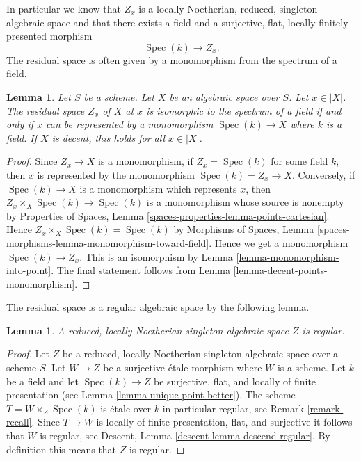 \documentclass{stacks-project}
\theoremstyle{plain}
\newtheorem{lemma}[subsection]{Lemma}
\theoremstyle{definition}
\theoremstyle{remark}
\numberwithin{equation}{subsection}
\def\Spec{\mathop{\mathrm{Spec}}}
\begin{document}
\noindent
In particular we know that $Z_x$ is a
locally Noetherian, reduced, singleton algebraic space
and that there exists a field and a surjective, flat, locally
finitely presented morphism
$$
\Spec(k) \longrightarrow Z_x.
$$
The residual space is often given by a monomorphism
from the spectrum of a field.

\begin{lemma}
\label{lemma-residual-space-monomorphism}
Let $S$ be a scheme. Let $X$ be an algebraic space over $S$. Let $x \in |X|$.
The residual space $Z_x$ of $X$ at $x$ is isomorphic to the spectrum of a field
if and only if $x$ can be represented by a monomorphism $\Spec(k) \to X$
where $k$ is a field. If $X$ is decent, this holds for all $x \in |X|$.
\end{lemma}

\begin{proof}
Since $Z_x \to X$ is a monomorphism, if $Z_x = \Spec(k)$ for some field $k$,
then $x$ is represented by the monomorphism $\Spec(k) = Z_x \to X$.
Conversely, if $\Spec(k) \to X$ is a monomorphism which represents $x$,
then $Z_x \times_X \Spec(k) \to \Spec(k)$ is a monomorphism whose source
is nonempty by Properties of Spaces, Lemma
\ref{spaces-properties-lemma-points-cartesian}.
Hence $Z_x \times_X \Spec(k) = \Spec(k)$ by Morphisms of Spaces, Lemma
\ref{spaces-morphisms-lemma-monomorphism-toward-field}.
Hence we get a monomorphism $\Spec(k) \to Z_x$. This is
an isomorphism by Lemma \ref{lemma-monomorphism-into-point}.
The final statement follows from Lemma \ref{lemma-decent-points-monomorphism}.
\end{proof}

\noindent
The residual space is a regular algebraic space by the following lemma.

\begin{lemma}
\label{lemma-residual-space-regular}
A reduced, locally Noetherian singleton algebraic space $Z$ is regular.
\end{lemma}

\begin{proof}
Let $Z$ be a reduced, locally Noetherian singleton algebraic space
over a scheme $S$. Let $W \to Z$ be a surjective \'etale morphism where $W$
is a scheme. Let $k$ be a field and let $\Spec(k) \to Z$
be surjective, flat, and locally of finite presentation (see
Lemma \ref{lemma-unique-point-better}).
The scheme $T = W \times_Z \Spec(k)$ is
\'etale over $k$ in particular regular, see
Remark \ref{remark-recall}.
Since $T \to W$ is locally of finite presentation, flat, and surjective it
follows that $W$ is regular, see
Descent, Lemma \ref{descent-lemma-descend-regular}.
By definition this means that $Z$ is regular.
\end{proof}
\end{document}
